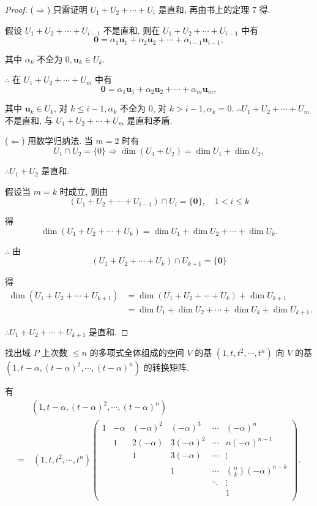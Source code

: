 \documentclass[color=black,device=normal,lang=cn,mode=geye]{elegantnote}
\begin{document}
\begin{proof}
    ($\Rightarrow$) 只需证明 $U_1+U_2+\cdots+U_i$ 是直和, 再由书上的定理 7 得.

    假设 $U_1+U_2+\cdots+U_{i-1}$ 不是直和, 则在 $U_1+U_2+\cdots+U_{i-1}$ 中有
    \[\boldsymbol{0}=\alpha_1\boldsymbol{u}_1+\alpha_2\boldsymbol{u}_2+\cdots+\alpha_{i-1}\boldsymbol{u}_{i-1},\]

    其中 $\alpha_k$ 不全为 $0,\boldsymbol{u}_k\in U_k$.

    $\therefore$ 在 $U_1+U_2+\cdots+U_m$ 中有
    \[\boldsymbol{0}=\alpha_1\boldsymbol{u}_1+\alpha_2\boldsymbol{u}_2+\cdots+\alpha_m\boldsymbol{u}_m,\]

    其中 $\boldsymbol{u}_k\in U_k$, 对 $k\leq i-1,\alpha_k$ 不全为 $0$, 对 $k>i-1,\alpha_k=0$. $\therefore U_1+U_2+\cdots+U_m$ 不是直和, 与 $U_1+U_2+\cdots+U_m$ 是直和矛盾.

    ($\Leftarrow$) 用数学归纳法. 当 $m=2$ 时有
    \[U_1\cap U_2=\{0\}\Rightarrow\dim(U_1+U_2)=\dim U_1+\dim U_2,\]

    $\therefore U_1+U_2$ 是直和.

    假设当 $m=k$ 时成立, 则由
    \[(U_1+U_2+\cdots+U_{i-1})\cap U_i=\{\boldsymbol{0}\},\quad 1<i\leq k\]

    得
    \[\dim(U_1+U_2+\cdots+U_k)=\dim U_1+\dim U_2+\cdots+\dim U_k.\]

    $\therefore$ 由
    \[(U_1+U_2+\cdots+U_k)\cap U_{k+1}=\{\boldsymbol{0}\}\]

    得
    \begin{align*}
        \dim(U_1+U_2+\cdots+U_{k+1}) & =\dim(U_1+U_2+\cdots+U_k)+\dim U_{k+1} \\
        & =\dim U_1+\dim U_2+\cdots+\dim U_k+\dim U_{k+1}.
    \end{align*}

    $\therefore U_1+U_2+\cdots+U_{k+1}$ 是直和.
\end{proof}
\begin{exercise}%
    找出域 $P$ 上次数 $\leq n$ 的多项式全体组成的空间 $V$ 的基 $(1,t,t^2,\cdots,t^n)$ 向 $V$ 的基 $(1,t-\alpha,(t-\alpha)^2,\cdots,(t-\alpha)^n)$ 的转换矩阵.
\end{exercise}
\begin{solution}
    有
    \begin{align*}
          & (1,t-\alpha,(t-\alpha)^2,\cdots,(t-\alpha)^n) \\
        = & \ (1,t,t^2,\cdots,t^n)\begin{pmatrix}
        1 & -\alpha & (-\alpha)^2 & (-\alpha)^3  & \cdots & (-\alpha)^n \\
          & 1       & 2(-\alpha)  & 3(-\alpha)^2 & \cdots & n(-\alpha)^{n-1} \\
          &         & 1           & 3(-\alpha)   & \cdots & \vdots \\
          &         &             & 1            & \cdots & \binom{n}{k}(-\alpha)^{n-k} \\
          &         &             &              & \ddots & \vdots \\
          &  &  &  &  & 1 \\
    \end{pmatrix}.
    \end{align*}
\end{solution}
\end{document}
